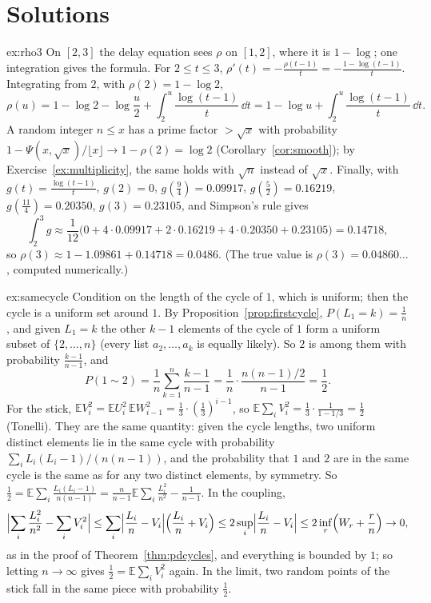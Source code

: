 \section{Solutions}

\begin{solution}{ex:rho3}
\idea On $[2,3]$ the delay equation sees $\rho$ on $[1,2]$, where it is $1-\log$; one integration gives the formula.
\writeup For $2\le t\le3$, $\rho'(t)=-\frac{\rho(t-1)}t=-\frac{1-\log(t-1)}t$. Integrating from $2$, with $\rho(2)=1-\log2$,
\[
\rho(u)=1-\log2-\log\frac u2+\int_2^u\frac{\log(t-1)}t\,\dd t=1-\log u+\int_2^u\frac{\log(t-1)}t\,\dd t.
\]
A random integer $n\le x$ has a prime factor $>\sqrt x$ with probability $1-\Psi(x,\sqrt x)/\lfloor x\rfloor\to1-\rho(2)=\log2$ (Corollary~\ref{cor:smooth}); by Exercise~\ref{ex:multiplicity}, the same holds with $\sqrt n$ instead of $\sqrt x$. Finally, with $g(t)=\frac{\log(t-1)}t$, $g(2)=0$, $g(\frac94)=0.09917$, $g(\frac52)=0.16219$, $g(\frac{11}4)=0.20350$, $g(3)=0.23105$, and Simpson's rule gives
\[
\int_2^3g\approx\frac1{12}\bigl(0+4\cdot0.09917+2\cdot0.16219+4\cdot0.20350+0.23105\bigr)=0.14718,
\]
so $\rho(3)\approx1-1.09861+0.14718=0.0486$. (The true value is $\rho(3)=0.04860\ldots$, computed numerically.)
\end{solution}

\begin{solution}{ex:samecycle}
\idea Condition on the length of the cycle of $1$, which is uniform; then the cycle is a uniform set around $1$.
\writeup By Proposition~\ref{prop:firstcycle}, $P(L_1=k)=\frac1n$, and given $L_1=k$ the other $k-1$ elements of the cycle of $1$ form a uniform subset of $\{2,\dots,n\}$ (every list $a_2,\dots,a_k$ is equally likely). So $2$ is among them with probability $\frac{k-1}{n-1}$, and
\[
P(1\sim2)=\frac1n\sum_{k=1}^n\frac{k-1}{n-1}=\frac1n\cdot\frac{n(n-1)/2}{n-1}=\frac12.
\]
For the stick, $\mathbb EV_i^2=\mathbb EU_i^2\,\mathbb EW_{i-1}^2=\frac13\cdot(\frac13)^{i-1}$, so $\mathbb E\sum_iV_i^2=\frac13\cdot\frac1{1-1/3}=\frac12$ (Tonelli). They are the same quantity: given the cycle lengths, two uniform distinct elements lie in the same cycle with probability
$\sum_iL_i(L_i-1)/(n(n-1))$, and the probability that $1$ and $2$ are in the same cycle is the same as for any two distinct elements, by symmetry. So $\frac12=\mathbb E\sum_i\frac{L_i(L_i-1)}{n(n-1)}=\frac n{n-1}\mathbb E\sum_i\frac{L_i^2}{n^2}-\frac1{n-1}$. In the coupling,
\[
\Bigl|\sum_i\frac{L_i^2}{n^2}-\sum_iV_i^2\Bigr|\le\sum_i\Bigl|\frac{L_i}n-V_i\Bigr|\Bigl(\frac{L_i}n+V_i\Bigr)\le2\sup_i\Bigl|\frac{L_i}n-V_i\Bigr|\le2\inf_r\Bigl(W_r+\frac rn\Bigr)\to0,
\]
as in the proof of Theorem~\ref{thm:pdcycles}, and everything is bounded by $1$; so letting $n\to\infty$ gives $\frac12=\mathbb E\sum_iV_i^2$ again. In the limit, two random points of the stick fall in the same piece with probability $\frac12$.
\end{solution}

